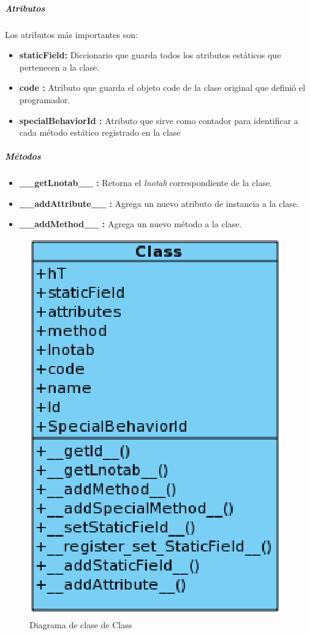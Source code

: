 \documentclass[12pt,legalpaper]{report}
\begin{document}
					\subparagraph{Atributos}

Los atributos más importantes son:

\begin{itemize}
	\item \textbf{staticField:} Diccionario que guarda todos los atributos estáticos que pertenecen a la clase.
	\item \textbf{code :} Atributo que guarda el objeto code \cite{code} de la clase original que definió el programador.
	\item \textbf{specialBehaviorId :} Atributo que sirve como contador para identificar a cada método estático registrado en la clase
\end{itemize}					
					
					\subparagraph{Métodos}	

\begin{itemize}
	\item \textbf{\_\_getLnotab\_\_ :} Retorna el \textit{lnotab} correspondiente de la clase.
	\item \textbf{\_\_addAttribute\_\_ :} Agrega un nuevo atributo de instancia a la clase.
	\item \textbf{\_\_addMethod\_\_ :} Agrega un nuevo método a la clase.
\end{itemize}					

				
\begin{figure}[!h]
	\centering
	\includegraphics[scale=0.6]{images/Clases/Class.eps}
	\caption{Diagrama de clase de Class}
\end{figure}
					
\end{document}
